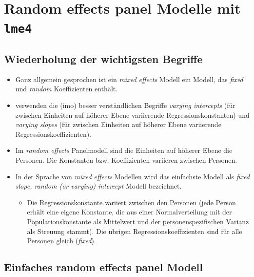 \documentclass[
]{book}
\providecommand{\tightlist}{%
  \setlength{\itemsep}{0pt}\setlength{\parskip}{0pt}}
\begin{document}
\hypertarget{random-effects-panel-modelle-mit-lme4}{%
\section{\texorpdfstring{Random effects panel Modelle mit \texttt{lme4}}{Random effects panel Modelle mit lme4}}\label{random-effects-panel-modelle-mit-lme4}}

\hypertarget{wiederholung-der-wichtigsten-begriffe}{%
\subsection*{Wiederholung der wichtigsten Begriffe}\label{wiederholung-der-wichtigsten-begriffe}}

\begin{itemize}
\tightlist
\item
  Ganz allgemein gesprochen ist ein \emph{mixed effects} Modell ein Modell, das \emph{fixed} und \emph{random} Koeffizienten enthält.
\item
  \citet{gelmanDataAnalysisUsing2006} verwenden die (imo) besser verständlichen Begriffe \emph{varying intercepts} (für zwischen Einheiten auf höherer Ebene variierende Regressionskonstanten) und \emph{varying slopes} (für zwischen Einheiten auf höherer Ebene variierende Regressionskoeffizienten).
\item
  Im \emph{random effects} Panelmodell sind die Einheiten auf höherer Ebene die Personen. Die Konstanten bzw. Koeffizienten variieren zwischen Personen.
\item
  In der Sprache von \emph{mixed effects} Modellen wird das einfachste Modell als \emph{fixed slope, random (or varying) intercept} Modell bezeichnet.

  \begin{itemize}
  \tightlist
  \item
    Die Regressionskonstante variiert zwischen den Personen (jede Person erhält eine eigene Konstante, die aus einer Normalverteilung mit der Populationskonstante als Mittelwert und der personenspezifischen Varianz als Streuung stammt).
    Die übrigen Regressionskoeffizienten sind für alle Personen gleich (\emph{fixed}).
  \end{itemize}
\end{itemize}

\hypertarget{einfaches-random-effects-panel-modell}{%
\subsection*{Einfaches random effects panel Modell}\label{einfaches-random-effects-panel-modell}}
\end{document}
